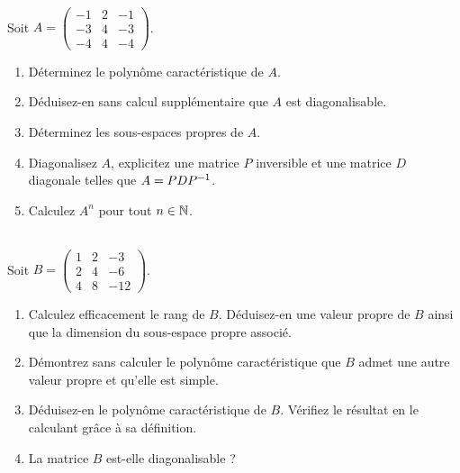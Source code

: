 \begin{corr}
\end{corr}

\begin{exos}[Exercice 8]~\\
Soit \(A=\begin{pmatrix}
-1 & 2 & -1 \\
-3 & 4 & -3 \\
-4 & 4 & -4
\end{pmatrix}\).

\begin{enumerate}
    \item Déterminez le polynôme caractéristique de \(A\). \\
    \item Déduisez-en sans calcul supplémentaire que \(A\) est diagonalisable. \\
    \item Déterminez les sous-espaces propres de \(A\). \\
    \item Diagonalisez \(A\), \cad explicitez une matrice \(P\) inversible et une matrice \(D\) diagonale telles que \(A=PDP^{-1}\). \\
    \item Calculez \(A^n\) pour tout \(n\in\mathbb{N}\).
\end{enumerate}
\end{exos}

\begin{corr}
\end{corr}

\begin{exos}~\\
Soit \(B=\begin{pmatrix}
1 & 2 & -3 \\
2 & 4 & -6 \\
4 & 8 & -12
\end{pmatrix}\).

\begin{enumerate}
    \item Calculez efficacement le rang de \(B\). Déduisez-en une valeur propre de \(B\) ainsi que la dimension du sous-espace propre associé. \\
    \item Démontrez sans calculer le polynôme caractéristique que \(B\) admet une autre valeur propre et qu'elle est simple. \\
    \item Déduisez-en le polynôme caractéristique de \(B\). Vérifiez le résultat en le calculant grâce à sa définition. \\
    \item La matrice \(B\) est-elle diagonalisable ?
\end{enumerate}
\end{exos}

